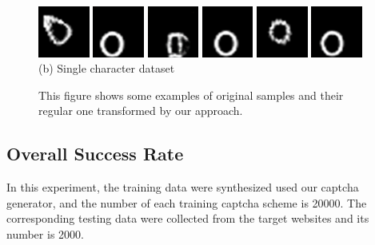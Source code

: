 \begin{figure}
{\begin{minipage}[t]{0.45\textwidth}
        \includegraphics[width=0.15\textwidth]{fig/experiment_onechar/o-1.png}
        \includegraphics[width=0.15\textwidth]{fig/experiment_onechar/o-2.png}
        \includegraphics[width=0.15\textwidth]{fig/experiment_onechar/o-7.png}
        \includegraphics[width=0.15\textwidth]{fig/experiment_onechar/o-8.png}
        \includegraphics[width=0.15\textwidth]{fig/experiment_onechar/o-13.png}
        \includegraphics[width=0.15\textwidth]{fig/experiment_onechar/o-14.png} \\
        \centering (b) Single character dataset
    \end{minipage}
    }
  \caption{This figure shows some examples of original samples and their regular one transformed by our approach.}
  \label{fig: mnist_show}
\end{figure}

\subsection{Overall Success Rate}
In this experiment, the training data were synthesized used our captcha generator, and the number of each training captcha scheme is 20000. The corresponding testing data were collected from the target websites and its number is 2000.
